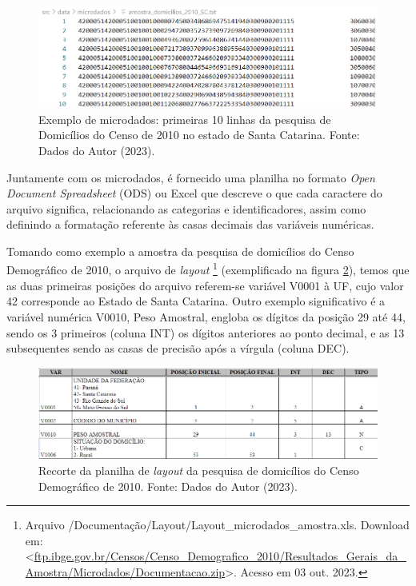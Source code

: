\begin{figure}[ht]
    \centering
    \includegraphics[width=\textwidth]{files/img/exemplo_microdado.png}
    \caption{Exemplo de microdados: primeiras 10 linhas da pesquisa de Domicílios do Censo de 2010 no estado de Santa Catarina. Fonte: Dados do Autor (2023)\protect\footnotemark.}
    \label{fig:exemplo-microdado}
\end{figure}

    Juntamente com os microdados, é fornecido uma planilha no formato \textit{Open Document Spreadsheet} (ODS) ou Excel que descreve o que cada caractere do arquivo significa, relacionando as categorias e identificadores, assim como definindo a formatação referente às casas decimais das variáveis numéricas. 
    
    Tomando como exemplo a amostra da pesquisa de domicílios do Censo Demográfico de 2010, o arquivo de \textit{layout}
    \footnote{Arquivo /Documentação/Layout/Layout\_microdados\_amostra.xls. Download em: <\url{ftp.ibge.gov.br/Censos/Censo_Demografico_2010/Resultados_Gerais_da_Amostra/Microdados/Documentacao.zip}>. Acesso em 03 out. 2023.} (exemplificado na figura \ref{fig:layout-domi}), temos que as duas primeiras posições do arquivo referem-se variável V0001 à UF, cujo valor 42 corresponde ao Estado de Santa Catarina. Outro exemplo significativo é a variável numérica V0010, Peso Amostral, engloba os dígitos da posição 29 até 44, sendo os 3 primeiros (coluna INT) os dígitos anteriores ao ponto decimal, e as 13 subsequentes sendo as casas de precisão após a vírgula (coluna DEC).

\begin{figure}[ht]
    \centering
    \includegraphics[width=\textwidth]{files/img/layout amostra domicilios 2010.png}
    \caption{Recorte da planilha de \textit{layout} da pesquisa de domicílios do Censo Demográfico de 2010. Fonte: Dados do Autor (2023)\protect\footnotemark.}
    \label{fig:layout-domi}
\end{figure}


